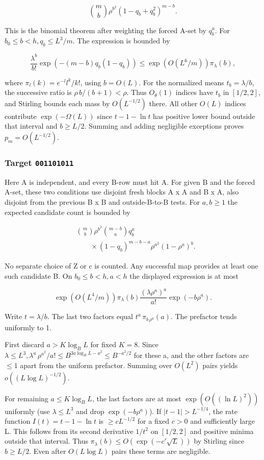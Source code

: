 \documentclass[11pt]{article}
\begin{document}
\[
\binom mb\rho^{b^2}(1-q_b+q_b^2)^{m-b}.
\]

This is the binomial theorem after weighting the forced A-set by $q_{b}^{a}$. For $b_{0}\leq b<h, q_{b}\leq L^{3}/m$. The expression is bounded by

\[
\frac{\lambda^b}{b!}\exp(-(m-b)q_b(1-q_b))
\leq \exp(O(L^6/m))\pi_\lambda(b),
\]

where $\pi_l(k)=e^{-l}l^k/k!$, using $b=O(L)$. For the normalized means $t_{b}=\lambda /b$, the successive ratio is $\rho \,b/(b+1)<\rho $. Thus $O_{\theta }(1)$ indices have $t_{b}$ in $[1/2,2]$, and Stirling bounds each mass by $O(L^{-1/2})$ there. All other $O(L)$ indices contribute $\exp (-\Omega (L))$ since $t-1-\ln  t$ has positive lower bound outside that interval and $b\geq L/2$. Summing and adding negligible exceptions proves $p_{m}=O(L^{-1/2})$.

\subsubsection{Target \texttt{001101011}}

Here A is independent, and every B-row must hit A. For given B and the forced A-set, these two conditions use disjoint fresh blocks A x A and B x A, also disjoint from the previous B x B and outside-B-to-B tests. For $a,b\geq 1$ the expected candidate count is bounded by

\[
\begin{aligned}
&\binom mb\rho^{b^2}\binom{m-b}{a}q_b^a\\
&\qquad{}\times(1-q_b)^{m-b-a}\rho^{a^2}(1-\rho^a)^b.
\end{aligned}
\]

No separate choice of Z or c is counted. Any successful map provides at least one such candidate B. On $b_{0}\leq b<h, a<h$ the displayed expression is at most

\[
\exp(O(L^4/m))\pi_\lambda(b)
\frac{(\lambda\rho^a)^a}{a!}\exp(-b\rho^a).
\]

Write $t=\lambda /b$. The last two factors equal $t^{a}\,\pi _{b\,\rho ^{a}}(a)$. The prefactor tends uniformly to 1.

First discard $a>K \log _{B} L$ for fixed $K=8$. Since $\lambda \leq L^{3}, \lambda ^{a}\,\rho ^{a^{2}}/a! \leq  B^{3a \log _{B} L-a^{2}}\leq B^{-a^{2}/2}$ for these a, and the other factors are $\leq 1$ apart from the uniform prefactor. Summing over $O(L^{2})$ pairs yields $o((L \log  L)^{-1/2})$.

For remaining $a\leq K \log _{B} L$, the last factors are at most $\exp (O((\ln  L)^{2}))$ uniformly (use $\lambda \leq L^{3}$ and drop $\exp(-b\rho^a)$). If $|t-1|>L^{-1/4}$, the rate function $I(t)=t-1-\ln  t$ is $\geq c L^{-1/2}$ for a fixed $c>0$ and sufficiently large L. This follows from its second derivative $1/t^{2}$ on $[1/2,2]$ and positive minima outside that interval. Thus $\pi _{\lambda }(b)\leq O(\exp (-c' \sqrt{L}))$ by Stirling since $b\geq L/2$. Even after $O(L \log  L)$ pairs these terms are negligible.
\end{document}
